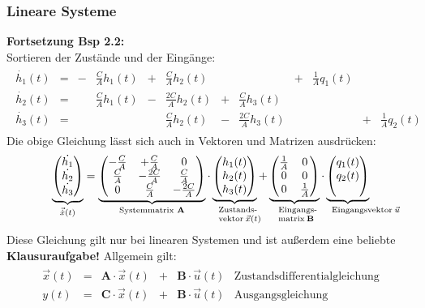 \documentclass[12pt,a4paper,ngerman]{scrartcl}
\begin{document}
\subsubsection{Lineare Systeme}

\textbf{Fortsetzung Bsp 2.2:}\\
Sortieren der Zustände und der Eingänge:
\begin{align*}
  \begin{array}{lllllllllllll}
    \dot{h_1}(t)&=&-&\frac{C}{A}h_1(t)&+&\frac{C}{A}h_2(t)&&&+&\frac{1}{A}q_1(t)\\
    \dot{h_2}(t)&=&&\frac{C}{A}h_1(t)&-&\frac{2C}{A}h_2(t)&+&\frac{C}{A}h_3(t)\\
    \dot{h_3}(t)&=&&&&\frac{C}{A}h_2(t)&-&\frac{2C}{A}h_3(t)&&&+&\frac{1}{A}q_2(t)
  \end{array}
\end{align*}
Die obige Gleichung lässt sich auch in Vektoren und Matrizen ausdrücken:
\begin{align*}\underbrace{
  \begin{pmatrix}
    \dot{h_1}\\
    \dot{h_2}\\
    \dot{h_3}
  \end{pmatrix}}_{\vec{\dot{x}}(t)}
=
\underbrace{
\begin{pmatrix}
  -\frac{C}{A}&+\frac{C}{A}&0\\
  \frac{C}{A}&-\frac{2C}{A}&\frac{C}{A}\\
  0&\frac{C}{A}&-\frac{2C}{A}
\end{pmatrix}}_{\text{Systemmatrix }\mathbf{A}}
\cdot
\underbrace{
\begin{pmatrix}
h_1(t)\\
h_2(t)\\
h_3(t)  
\end{pmatrix}}_{\parbox{1cm}{\scriptsize Zustands\-vektor~$\vec{x}(t)$}}
+
\underbrace{
\begin{pmatrix}
\frac{1}{A}&0\\
0&0\\
0&\frac{1}{A}  
\end{pmatrix}}_{\parbox{1cm}{\scriptsize Eingangs\-matrix~$\mathbf{B}$}}
\cdot
\underbrace{
  \begin{pmatrix}
    q_1(t)\\
    q_2(t)\\
~
  \end{pmatrix}}_{\parbox{1cm}{\scriptsize Eingangsvektor~$\vec{u}$}}
\end{align*}
Diese Gleichung gilt nur bei linearen Systemen und ist außerdem eine beliebte \textbf{Klausuraufgabe!} Allgemein gilt:
\begin{align*}
  \begin{array}{lllllll}
    \vec{x}(t)&=&\mathbf{A}\cdot\vec{x}(t)&+&\mathbf{B}\cdot\vec{u}(t)&\text{Zustandsdifferentialgleichung}\\
    y(t)&=&\mathbf{C}\cdot \vec{x}(t)&+&\mathbf{B}\cdot\vec{u}(t)&\text{Ausgangsgleichung}
  \end{array}
\end{align*}
\end{document}
